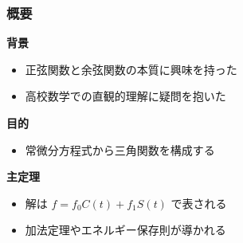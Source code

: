 \documentclass[aspectratio=169]{beamer}
\newenvironment{sectionblock}[1]{%
  \begin{minipage}{\textwidth}%
    \textbf{\large #1}\par\vspace{0.5em}%
}{%
  \end{minipage}\vspace{1em}%
}
\newcommand{\sectioncontent}[2]{%
  \begin{sectionblock}{#1}%
    \begin{itemize}%
      #2%
    \end{itemize}%
  \end{sectionblock}%
}
\begin{document}
\begin{frame}
  \frametitle{概要}

  \sectioncontent{背景}{
    \item 正弦関数と余弦関数の本質に興味を持った
    \item 高校数学での直観的理解に疑問を抱いた
  }

  \sectioncontent{目的}{
    \item 常微分方程式から三角関数を構成する
  }

  \sectioncontent{主定理}{
    \item 解は $f = f_0 C(t) + f_1 S(t)$ で表される
    \item 加法定理やエネルギー保存則が導かれる
  }

\end{frame}
\end{document}
